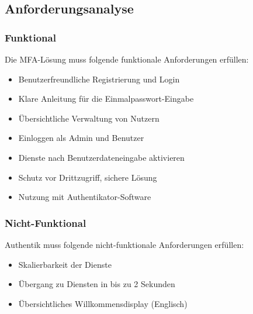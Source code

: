 \subsection{Anforderungsanalyse}
\label{sec:Anforderungsanalyse}

\subsubsection{Funktional}
\label{sec:Funktional}
Die MFA-Lösung muss folgende funktionale Anforderungen erfüllen:
\begin{itemize} [label=--]
	\item Benutzerfreundliche Registrierung und Login
	\item Klare Anleitung für die Einmalpasswort-Eingabe
	\item Übersichtliche Verwaltung von Nutzern
	\item Einloggen als Admin und Benutzer
	\item Dienste nach Benutzerdateneingabe aktivieren
	\item Schutz vor Drittzugriff, sichere Lösung
	\item Nutzung mit Authentikator-Software
\end{itemize}

\subsubsection{Nicht-Funktional}
\label{sec:Nicht-Funktional}
Authentik muss folgende nicht-funktionale Anforderungen erfüllen:
\begin{itemize} [label=--]
	\item Skalierbarkeit der Dienste
	\item Übergang zu Diensten in bis zu 2 Sekunden
	\item Übersichtliches Willkommensdisplay (Englisch)
\end{itemize}
	